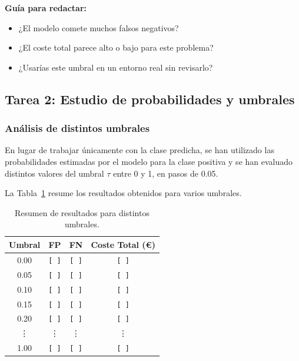 \vspace{0.3cm}
\noindent\textbf{Guía para redactar:}
\begin{itemize}
    \item ¿El modelo comete muchos falsos negativos?
    \item ¿El coste total parece alto o bajo para este problema?
    \item ¿Usarías este umbral en un entorno real sin revisarlo?
\end{itemize}

\subsection{Tarea 2: Estudio de probabilidades y umbrales}

\subsubsection{Análisis de distintos umbrales}
En lugar de trabajar únicamente con la clase predicha, se han utilizado las probabilidades estimadas por el modelo para la clase positiva y se han evaluado distintos valores del umbral \(\tau\) entre 0 y 1, en pasos de 0.05.

La Tabla~\ref{tab:umbrales_coste} resume los resultados obtenidos para varios umbrales.

\begin{table}[H]
\centering
\caption{Resumen de resultados para distintos umbrales.}
\label{tab:umbrales_coste}
\begin{tabular}{c c c c}
\toprule
\textbf{Umbral} & \textbf{FP} & \textbf{FN} & \textbf{Coste Total (€)} \\
\midrule
0.00 & \texttt{[ ]} & \texttt{[ ]} & \texttt{[ ]} \\
0.05 & \texttt{[ ]} & \texttt{[ ]} & \texttt{[ ]} \\
0.10 & \texttt{[ ]} & \texttt{[ ]} & \texttt{[ ]} \\
0.15 & \texttt{[ ]} & \texttt{[ ]} & \texttt{[ ]} \\
0.20 & \texttt{[ ]} & \texttt{[ ]} & \texttt{[ ]} \\
\vdots & \vdots & \vdots & \vdots \\
1.00 & \texttt{[ ]} & \texttt{[ ]} & \texttt{[ ]} \\
\bottomrule
\end{tabular}
\end{table}

